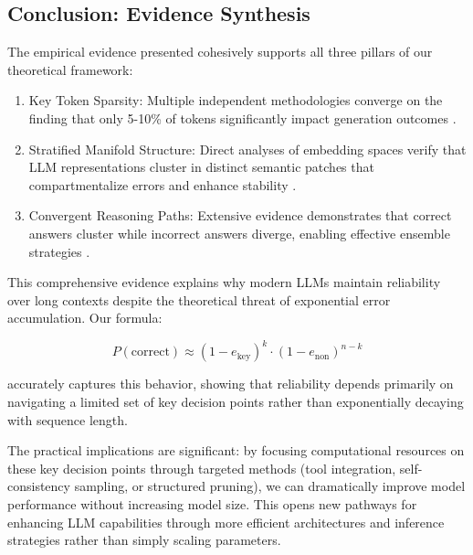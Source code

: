 \documentclass{article}
\begin{document}
\subsection{Conclusion: Evidence Synthesis}

The empirical evidence presented cohesively supports all three pillars of our theoretical framework:

\begin{enumerate}
\item Key Token Sparsity: Multiple independent methodologies converge on the finding that only 5-10\% of tokens significantly impact generation outcomes \citep{liu2023lost, pang2024anchor, fang2024what, jin2020textfooler, moshkov2025aimo}.

\item Stratified Manifold Structure: Direct analyses of embedding spaces verify that LLM representations cluster in distinct semantic patches that compartmentalize errors and enhance stability \citep{li2025unraveling, robinson2025token, viswanathan2024geometry, gao2024insights}.

\item Convergent Reasoning Paths: Extensive evidence demonstrates that correct answers cluster while incorrect answers diverge, enabling effective ensemble strategies \citep{wang2023self, yao2023tree, costello2025think}.
\end{enumerate}

This comprehensive evidence explains why modern LLMs maintain reliability over long contexts despite the theoretical threat of exponential error accumulation. Our formula:

\begin{equation}
P(\text{correct}) \approx (1-e_{\text{key}})^k \cdot (1-e_{\text{non}})^{n-k}
\end{equation}

accurately captures this behavior, showing that reliability depends primarily on navigating a limited set of key decision points rather than exponentially decaying with sequence length.

The practical implications are significant: by focusing computational resources on these key decision points through targeted methods (tool integration, self-consistency sampling, or structured pruning), we can dramatically improve model performance without increasing model size. This opens new pathways for enhancing LLM capabilities through more efficient architectures and inference strategies rather than simply scaling parameters.
\end{document}
